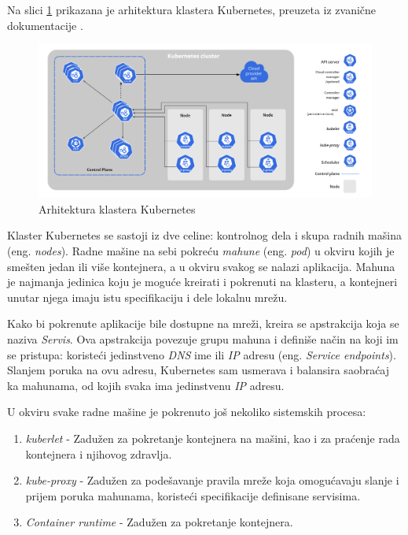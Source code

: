 \documentclass[12pt,oneside]{memoir}
\begin{document}
Na slici \ref{fig:kubernetesarh} prikazana je arhitektura klastera Kubernetes, preuzeta iz zvanične dokumentacije \cite{KubernetesArchitecture}.

\begin{figure}[!ht]
  \centering
  \includegraphics[width=1.0\textwidth]{./images/kubernetes_architecture.png}
  \caption{Arhitektura klastera Kubernetes}
  \label{fig:kubernetesarh}
\end{figure}

Klaster Kubernetes se sastoji iz dve celine: kontrolnog dela i skupa radnih mašina (eng. \emph{nodes}). Radne mašine na sebi pokreću \emph{mahune} (eng. \emph{pod}) u okviru kojih je smešten jedan ili više kontejnera, a u okviru svakog se nalazi aplikacija. Mahuna je najmanja jedinica koju je moguće kreirati i pokrenuti na klasteru, a kontejneri unutar njega imaju istu specifikaciju i dele lokalnu mrežu.

Kako bi pokrenute aplikacije bile dostupne na mreži, kreira se apstrakcija koja se naziva \emph{Servis}. Ova apstrakcija povezuje grupu mahuna i definiše način na koji im se pristupa: koristeći jedinstveno \emph{DNS} ime ili \emph{IP} adresu (eng. \emph{Service endpoints}). Slanjem poruka na ovu adresu, Kubernetes sam usmerava i balansira saobraćaj ka mahunama, od kojih svaka ima jedinstvenu \emph{IP} adresu.

U okviru svake radne mašine je pokrenuto još nekoliko sistemskih procesa: 
\begin{enumerate}
\item \emph{kuberlet} - Zadužen za pokretanje kontejnera na mašini, kao i za praćenje rada kontejnera i njihovog zdravlja.
\item \emph{kube-proxy} - Zadužen za podešavanje pravila mreže koja omogućavaju slanje i prijem poruka mahunama, koristeći specifikacije definisane servisima.
\item \emph{Container runtime} - Zadužen za pokretanje kontejnera.
\end{enumerate}
\end{document}
